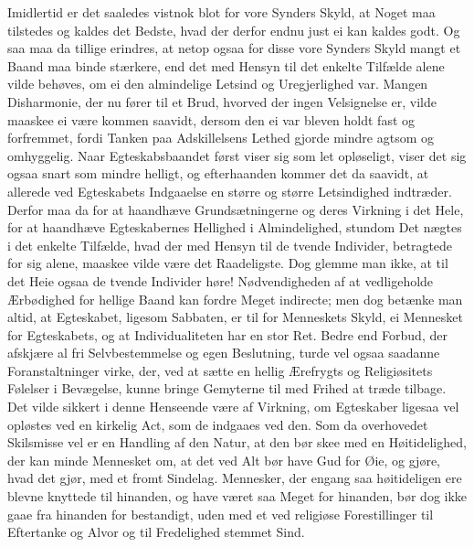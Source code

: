 \documentclass[12pt,a4paper]{book}
\newcommand{\apage}[1]{\marginnote{\footnotesize\textit{[#1]}}}
\begin{document}
Imidlertid er det saaledes vistnok blot for vore Synders Skyld, at Noget
maa tilstedes og kaldes det Bedste, hvad der derfor endnu just ei kan
kaldes godt. Og saa maa da tillige erindres, at netop ogsaa for disse
vore Synders Skyld mangt et Baand maa binde stærkere, end det med Hensyn
til det enkelte Tilfælde alene vilde behøves, om ei den almindelige
Letsind og Uregjerlighed \apage{138} var. Mangen Disharmonie, der nu fører til et
Brud, hvorved der ingen Velsignelse er, vilde maaskee ei være kommen
saavidt, dersom den ei var bleven holdt fast og forfremmet, fordi Tanken
paa Adskillelsens Lethed gjorde mindre agtsom og omhyggelig. Naar
Egteskabsbaandet først viser sig som let opløseligt, viser det sig ogsaa
snart som mindre helligt, og efterhaanden kommer det da saavidt, at
allerede ved Egteskabets Indgaaelse en større og større Letsindighed
indtræder. Derfor maa da for at haandhæve Grundsætningerne og deres
Virkning i det Hele, for at haandhæve Egteskabernes Hellighed i
Almindelighed, stundom Det nægtes i det enkelte Tilfælde, hvad der med
Hensyn til de tvende Individer, betragtede for sig alene, maaskee vilde
være det Raadeligste. Dog glemme man ikke, at til det Heie ogsaa de
tvende Individer høre! Nødvendigheden af at vedligeholde Ærbødighed for
hellige Baand kan fordre Meget indirecte; men dog betænke man altid, at
Egteskabet, ligesom Sabbaten, er til for Menneskets Skyld, ei Mennesket
for Egteskabets, og at Individualiteten har en stor Ret. Bedre end
Forbud, der afskjære al fri Selvbestemmelse og egen Beslutning, turde
vel ogsaa saadanne Foranstaltninger virke, der, ved at sætte en hellig
Ærefrygts og Religiøsitets Følelser i Bevægelse, kunne bringe
Gemyterne til med Frihed at træde tilbage. Det vilde sikkert i denne
Henseende være af Virkning, om Egteskaber ligesaa vel opløstes ved en
kirkelig Act, som de indgaaes ved den. Som da \apage{139} overhovedet Skilsmisse vel
er en Handling af den Natur, at den bør skee med en Høitidelighed, der
kan minde Mennesket om, at det ved Alt bør have Gud for Øie, og gjøre,
hvad det gjør, med et fromt Sindelag. Mennesker, der engang saa
høitideligen ere blevne knyttede til hinanden, og have været saa Meget
for hinanden, bør dog ikke gaae fra hinanden for bestandigt, uden med et
ved religiøse Forestillinger til Eftertanke og Alvor og til Fredelighed
stemmet Sind.
\end{document}
